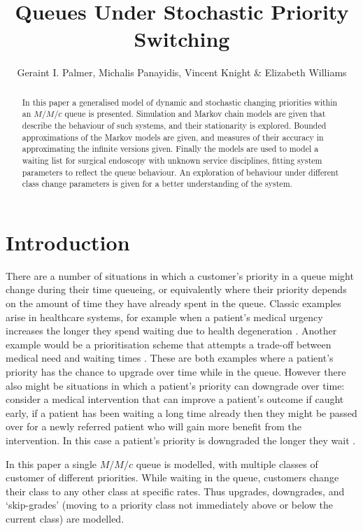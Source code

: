 \documentclass{article}
\title{Queues Under Stochastic Priority Switching}
\author{Geraint I. Palmer, Michalis Panayidis, Vincent Knight \& Elizabeth Williams}
\date{}
\begin{document}
\maketitle

\begin{abstract}
In this paper a generalised model of dynamic and stochastic changing priorities
within an $M/M/c$ queue is presented. Simulation and Markov chain models are
given that describe the behaviour of such systems, and their stationarity is
explored.
Bounded approximations of the Markov models are given, and measures of their
accuracy in approximating the infinite versions given. Finally the models are
used to model a waiting list for surgical endoscopy with unknown service
disciplines, fitting system parameters to reflect the queue behaviour. An
exploration of behaviour under different class change parameters is given for a
better understanding of the system. 
\end{abstract}

\section{Introduction}
There are a number of situations in which a customer's priority in a queue might
change during their time queueing, or equivalently where their priority depends
on the amount of time they have already spent in the queue.
Classic examples arise in healthcare systems, for example when a patient's
medical urgency increases the longer they spend waiting due to health
degeneration \cite{williams20, garbuzetal06, delongetal08}. Another example
would be a prioritisation scheme that attempts a trade-off between medical need
and waiting times \cite{powersetal23}.
These are both examples where a patient's priority has the chance to upgrade
over time while in the queue.
However there also might be situations in which a patient's priority can
downgrade over time: consider a medical intervention that can improve a
patient's outcome if caught early, if a patient has been waiting a long time
already then they might be passed over for a newly referred patient who will
gain more benefit from the intervention. In this case a patient's priority is
downgraded the longer they wait \cite{dalessandro17}.

In this paper a single $M/M/c$ queue is modelled, with multiple classes of
customer of different priorities. While waiting in the queue, customers change
their class to any other class at specific rates. Thus upgrades, downgrades, and
`skip-grades' (moving to a priority class not immediately above or below the
current class) are modelled.
\end{document}
